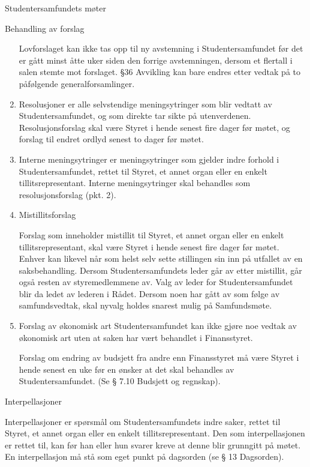 \begin{lovkapittel}{Studentersamfundets møter}
\begin{lovparagraf}{Behandling av forslag}
\begin{enumerate}
Lovforslaget kan ikke tas opp til ny avstemning i Studentersamfundet før det er gått minst åtte uker siden den
forrige avstemningen, dersom et flertall i salen stemte mot forslaget. §36 Avvikling kan bare endres etter
vedtak på to påfølgende generalforsamlinger.

\item Resolusjoner er alle selvstendige meningsytringer som blir vedtatt av Studentersamfundet, og som direkte tar
sikte på utenverdenen. Resolusjonsforslag skal være Styret i hende senest fire dager før møtet, og forslag til
endret ordlyd senest to dager før møtet.

\item Interne meningsytringer er meningsytringer som gjelder indre forhold i Studentersamfundet, rettet til Styret,
et annet organ eller en enkelt tillitsrepresentant. Interne meningsytringer skal behandles som
resolusjonsforslag (pkt. 2).

\item Mistillitsforslag

Forslag som inneholder mistillit til Styret, et annet organ eller en enkelt tillitsrepresentant, skal være Styret i
hende senest fire dager før møtet. Enhver kan likevel når som helst selv sette stillingen sin inn på utfallet av
en saksbehandling. Dersom Studentersamfundets leder går av etter mistillit, går også resten av
styremedlemmene av. Valg av leder for Studentersamfundet blir da ledet av lederen i Rådet. Dersom noen
har gått av som følge av samfundsvedtak, skal nyvalg holdes snarest mulig på Samfundsmøte.

\item Forslag av økonomisk art
Studentersamfundet kan ikke gjøre noe vedtak av økonomisk art uten at saken har vært behandlet i
Finansstyret.

Forslag om endring av budsjett fra andre enn Finansstyret må være Styret i hende senest en uke før en ønsker
at det skal behandles av Studentersamfundet. (Se § 7.10 Budsjett og regnskap).

\end{enumerate}

  \end{lovparagraf}
  
  \begin{lovparagraf}{Interpellasjoner}
  
Interpellasjoner er spørsmål om Studentersamfundets indre saker, rettet til Styret, et annet organ eller en enkelt
tillitsrepresentant. Den som interpellasjonen er rettet til, kan før han eller hun svarer kreve at denne blir grunngitt på
møtet. En interpellasjon må stå som eget punkt på dagsorden (se § 13 Dagsorden).
  
  \end{lovparagraf}

\end{lovkapittel}

